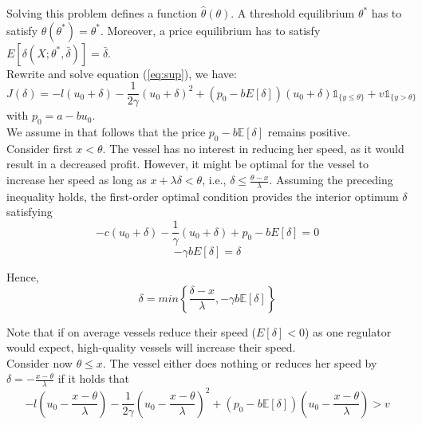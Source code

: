 \documentclass[a4paper,12pt]{article}
\begin{document}
Solving this problem defines a function $\hat{\theta}(\theta)$.
A threshold equilibrium $\theta^*$ has to satisfy $\hat{\theta}(\theta^*) = \theta^*$.
Moreover, a price equilibrium has to satisfy $E[\delta(X; \theta^*, \bar{\delta})] = \bar{\delta}$.\\

Rewrite and solve equation (\ref{eq:sup}), we have:
\begin{equation}
	J(\delta) = -l(u_0 + \delta) - \frac{1}{2\gamma}(u_0 + \delta)^2 + (p_0 - bE[\delta])(u_0 + \delta) \mathds{1}_{\{y \leq \theta\}} + v\mathds{1}_{\{y > \theta \}}
\end{equation}
with $p_0=a-bu_0$.\\

We assume in that follows that the price $p_0-b\mathbb{E}[\delta]$ remains positive.\\

Consider first $x < \theta$.
The vessel has no interest in reducing her speed, as it would result in a decreased profit.
However, it might be optimal for the vessel to increase her speed as long as $x + \lambda\delta < \theta$, i.e., $\delta \leq \frac{\theta - x}{\lambda}$.
Assuming the preceding inequality holds, the first-order optimal condition provides the interior optimum $\delta$ satisfying
\begin{equation}
	-c(u_0 + \delta) - \frac{1}{\gamma}(u_0 + \delta) + p_0 - bE[\delta] = 0
\end{equation}
\begin{equation}
	-\gamma bE[\delta] = \delta
\end{equation}

Hence,
\begin{equation}
	\delta = min \left\{ \dfrac{\delta-x}{\lambda}, -\gamma b \mathbb{E}[\delta]  \right\}
\end{equation}

Note that if on average vessels reduce their speed ($E[\delta] < 0$) as one regulator would expect, high-quality vessels will increase their speed.\\

Consider now $\theta \leq x$. The vessel either does nothing or reduces her speed by $\delta = -\frac{x - \theta}{\lambda}$ if it holds that
\begin{equation}
	-l\left(u_0 - \frac{x - \theta}{\lambda}\right) - \frac{1}{2\gamma}\left(u_0 - \frac{x - \theta}{\lambda}\right)^2 + (p_0 - b\mathbb{E}[\delta])\left(u_0 - \frac{x - \theta}{\lambda}\right) > v
\end{equation}
\end{document}
